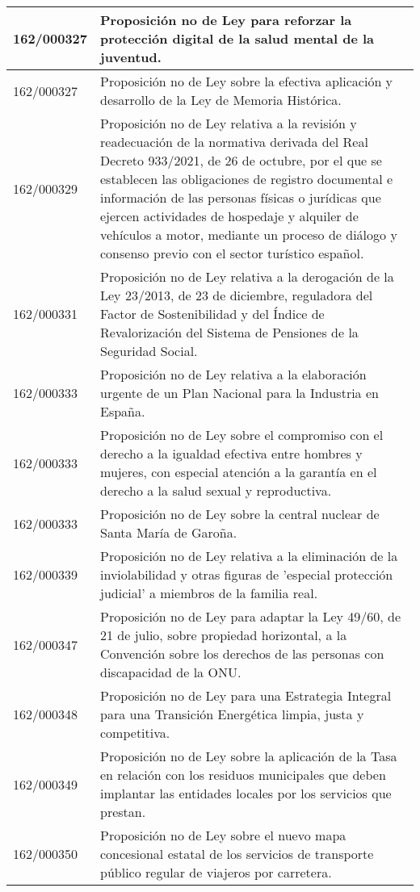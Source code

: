 {\begin{table}[H]
\begin{center}
\begin{tabularx}{\linewidth}{| l | X |}
\hline
162/000327 & Proposición no de Ley para reforzar la protección digital de la salud mental de la juventud. \\
\hline
162/000327 & Proposición no de Ley sobre la efectiva aplicación y desarrollo de la Ley de Memoria Histórica. \\
\hline
162/000329 & Proposición no de Ley relativa a la revisión y readecuación de la normativa derivada del Real Decreto 933/2021, de 26 de octubre, por el que se establecen las obligaciones de registro documental e información de las personas físicas o jurídicas que ejercen actividades de hospedaje y alquiler de vehículos a motor, mediante un proceso de diálogo y consenso previo con el sector turístico español. \\
\hline
162/000331 & Proposición no de Ley relativa a la derogación de la Ley 23/2013, de 23 de diciembre, reguladora del Factor de Sostenibilidad y del Índice de Revalorización del Sistema de Pensiones de la Seguridad Social. \\
\hline
162/000333 & Proposición no de Ley relativa a la elaboración urgente de un Plan Nacional para la Industria en España. \\
\hline
162/000333 & Proposición no de Ley sobre el compromiso con el derecho a la igualdad efectiva entre hombres y mujeres, con especial atención a la garantía en el derecho a la salud sexual y reproductiva. \\
\hline
162/000333 & Proposición no de Ley sobre la central nuclear de Santa María de Garoña. \\
\hline
162/000339 & Proposición no de Ley relativa a la eliminación de la inviolabilidad y otras figuras de 'especial protección judicial' a miembros de la familia real. \\
\hline
162/000347 & Proposición no de Ley para adaptar la Ley 49/60, de 21 de julio, sobre propiedad horizontal, a la Convención sobre los derechos de las personas con discapacidad de la ONU. \\
\hline
162/000348 & Proposición no de Ley para una Estrategia Integral para una Transición Energética limpia, justa y competitiva. \\
\hline
162/000349 & Proposición no de Ley sobre la aplicación de la Tasa en relación con los residuos municipales que deben implantar las entidades locales por los servicios que prestan. \\
\hline
162/000350 & Proposición no de Ley sobre el nuevo mapa concesional estatal de los servicios de transporte público regular de viajeros por carretera. \\

\end{tabularx}
\end{center}
\end{table}}
